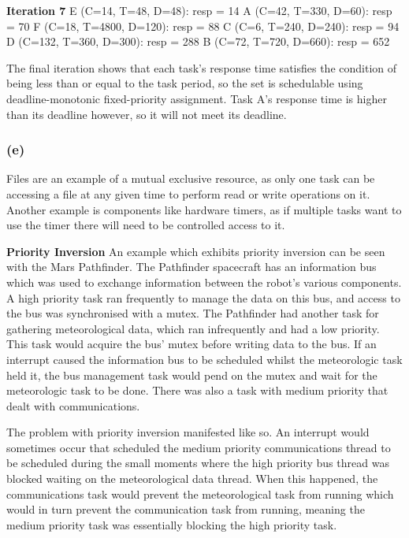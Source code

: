 \documentclass[]{report}
\begin{document}
			\textbf{Iteration 7} \newline
			E (C=14, T=48, D=48): resp = 14 \newline
			A (C=42, T=330, D=60): resp = 70 \newline
			F (C=18, T=4800, D=120): resp = 88 \newline
			C (C=6, T=240, D=240): resp = 94 \newline
			D (C=132, T=360, D=300): resp = 288 \newline
			B (C=72, T=720, D=660): resp = 652 \newline
		
			The final iteration shows that each task's response time satisfies the condition of being less than or equal to the task period, so the set is schedulable using deadline-monotonic fixed-priority assignment. Task A's response time is higher than its deadline however, so it will not meet its deadline.
			
			\subsubsection{(e)}
			Files are an example of a mutual exclusive resource, as only one task can be accessing a file at any given time to perform read or write operations on it. Another example is components like hardware timers, as if multiple tasks want to use the timer there will need to be controlled access to it. 
			\medskip

			\textbf{Priority Inversion}\newline
			An example which exhibits priority inversion can be seen with the Mars Pathfinder. The Pathfinder spacecraft has an information bus which was used to exchange information between the robot's various components. A high priority task ran frequently to manage the data on this bus, and access to the bus was synchronised with a mutex. The Pathfinder had another task for gathering meteorological data, which ran infrequently and had a low priority.  This task would acquire the bus' mutex before writing data to the bus. If an interrupt caused the information bus to be scheduled whilst the meteorologic task held it, the bus management task would pend on the mutex and wait for the meteorologic task to be done.  There was also a task with medium priority that dealt with communications. 
			
			The problem with priority inversion manifested like so. An interrupt would sometimes occur that scheduled the medium priority communications thread to be scheduled during the small moments where the high priority bus thread was blocked waiting on the meteorological data thread. When this happened, the communications task would prevent the meteorological task from running which would in turn prevent the communication task from running, meaning the medium priority task was essentially blocking the high priority task\cite{jones1997really}.
			\medskip
			
\end{document}
